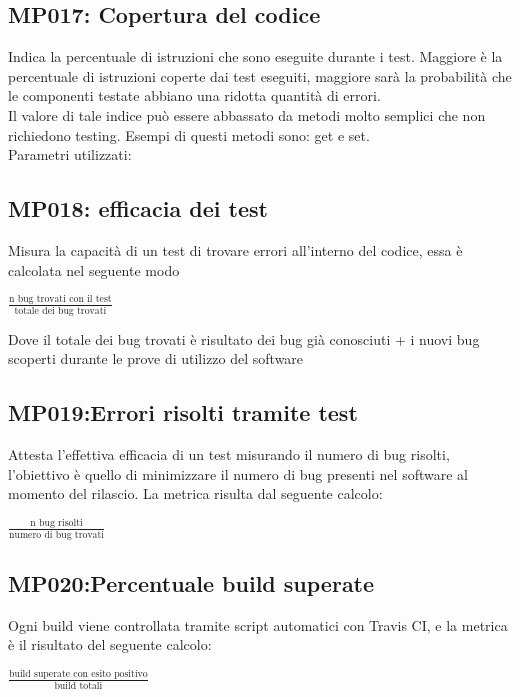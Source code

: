 \subsection{MP017: Copertura del codice}
Indica la percentuale di istruzioni che sono eseguite durante i test.
Maggiore è la percentuale di istruzioni coperte dai test eseguiti, maggiore sarà la probabilità che le componenti testate abbiano una ridotta quantità di errori.\\
Il valore di tale indice può essere abbassato da metodi molto semplici che non richiedono testing. Esempi di questi metodi sono: get e set.\\
Parametri utilizzati:

\subsection{MP018: efficacia dei test}
Misura la capacità di un test di trovare errori all'interno del codice, essa è calcolata nel seguente modo
\begin{center}
	\vspace{1em}
	$\frac{\mbox{n bug trovati con il test}}{\mbox{totale dei bug trovati}}$\\
\end{center}
\vspace{1em}
Dove il totale dei bug trovati è risultato dei bug già conosciuti + i nuovi bug scoperti durante le prove di utilizzo del software

\subsection{MP019:Errori risolti tramite test}
Attesta l'effettiva efficacia di un test misurando il numero di bug risolti, l'obiettivo è quello di minimizzare il numero di bug presenti nel software al momento del rilascio.
La metrica risulta dal seguente calcolo:
\begin{center}
\vspace{1em}
$\frac{\mbox{n bug risolti}}{\mbox{numero di bug trovati}}$
\end{center}
\subsection{MP020:Percentuale build superate}
Ogni build viene controllata tramite script automatici con Travis CI, e la metrica è il risultato del seguente calcolo:
\begin{center}
$\frac{\mbox{build superate con esito positivo}}{\mbox{build totali}}$
\end{center}


